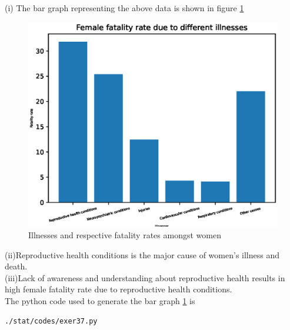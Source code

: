 (i) The bar graph representing the above data is shown in figure \ref{fig:bar37_py}\\
\begin{figure}[!ht]
\centering
\includegraphics[width=\columnwidth]{./stat/codes/pyfigs/exer37.eps}
\caption{Illnesses and respective fatality rates amongst women}
\label{fig:bar37_py}
\end{figure}
(ii)Reproductive health conditions is the major cause of women's illness and death.\\
(iii)Lack of awareness and understanding about reproductive health results in high female fatality rate due to reproductive health conditions.\\
The python code used to generate the bar graph \ref{fig:bar37_py} is
\begin{lstlisting}
./stat/codes/exer37.py
\end{lstlisting}
